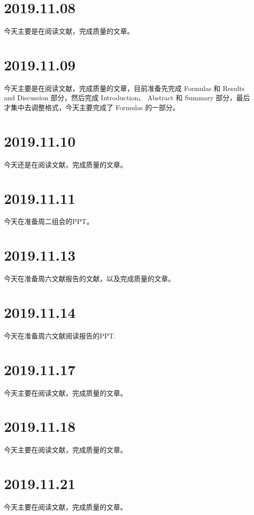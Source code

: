 \section{2019.11.08}
今天主要是在阅读文献，完成质量的文章。

\section{2019.11.09}
今天主要是在阅读文献，完成质量的文章，目前准备先完成 Formulas 和 Results and Discussion 部分，然后完成 Introduction、 Abstract 和 Summary 部分，最后才集中去调整格式，今天主要完成了 Formulas 的一部分。

\section{2019.11.10}
今天还是在阅读文献，完成质量的文章。

\section{2019.11.11}
今天在准备周二组会的PPT。

\section{2019.11.13}
今天在准备周六文献报告的文献，以及完成质量的文章。

\section{2019.11.14}
今天在准备周六文献阅读报告的PPT.

\section{2019.11.17}
今天主要在阅读文献，完成质量的文章。

\section{2019.11.18}
今天主要在阅读文献，完成质量的文章。

\section{2019.11.21}
今天主要在阅读文献，完成质量的文章。

